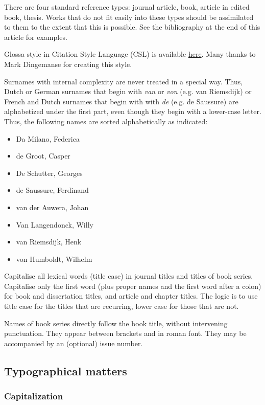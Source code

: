 \documentclass[charis,linguex]{glossa}
\begin{document}
There are four standard reference types: journal article, book, article in edited book, thesis. Works that do not fit easily into these types should be assimilated to them to the extent that this is possible. See the bibliography at the end of this article for examples.

Glossa style in Citation Style Language (CSL) is available \href{https://www.zotero.org/styles?q=Glossa}{here}. Many thanks to Mark Dingemanse for creating this style.

Surnames with internal complexity are never treated in a special way. Thus, Dutch or German surnames that begin with \textit{van} or \textit{von} (e.g. van Riemsdijk) or French and Dutch surnames that begin with with \textit{de} (e.g. de Saussure) are alphabetized under the first part, even though they begin with a lower-case letter. Thus, the following names are sorted alphabetically as indicated:

\begin{itemize}
\item Da Milano, Federica
\item de Groot, Casper
\item De Schutter, Georges
\item de Saussure, Ferdinand
\item van der Auwera, Johan
\item Van Langendonck, Willy
\item van Riemsdijk, Henk
\item von Humboldt, Wilhelm
\end{itemize}

Capitalise all lexical words (title case) in journal titles and titles of book series. Capitalise only the first word (plus proper names and the first word after a colon) for book and dissertation titles, and article and chapter titles. The logic is to use title case for the titles that are recurring, lower case for those that are not.

Names of book series directly follow the book title, without intervening punctuation. They appear between brackets and in roman font. They may be accompanied by an (optional) issue number.

\subsection{Typographical matters}

\subsubsection{Capitalization}
\end{document}
